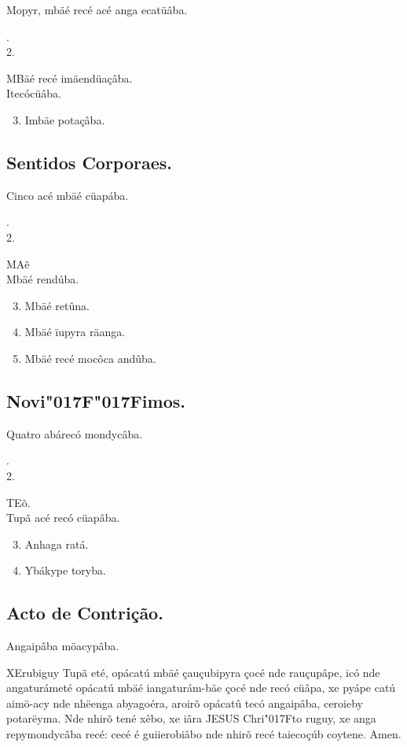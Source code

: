 \documentclass[openany,titlepage,12pt]{book}
\newcommand{\lgS}{\char"017F}
\newcommand{\lgSS}{\char"017F\char"017F}
\newcommand{\comecalista}[5]{
    \hspace*{-11.7pt}
    \begin{minipage}[t]{0.08\linewidth}
        \flushright #1\\#2
    \end{minipage}
    \hspace{0pt}
    \begin{minipage}[t]{0.94\linewidth}
        \lettrine
        [findent =2pt, nindent=0pt,  lines=2]
        {#3}{#4}#5
    \end{minipage}
    \vspace*{-3pt}
}
\begin{document}
\begin{center}
    Mopyr, mbäé recé acé anga ecatüâba.
\end{center}
\comecalista{1.}{2.}{M}{B}
    {äé recé imäendüaçâba.\\Itecócüâba.}
\vspace{2pt}
\begin{enumerate}
    \setcounter{enumi}{2}
    \item Imbäe potaçâba.
\end{enumerate}

\subsection{Sentidos Corporaes.}
\begin{center}
    Cinco acé mbäé cüapába.
\end{center}
\comecalista{1.}{2.}{M}{A}
    {ẽ\\Mbäé rendúba.}
\vspace{2pt}
\begin{enumerate}
    \setcounter{enumi}{2}
    \item Mbäé retûna.
    \item Mbäé ïupyra räanga.
    \item Mbäé recé mocôca andûba.
\end{enumerate}

\subsection{Novi\lgSS imos.}
\begin{center}
    Quatro abárecó mondycâba.    
\end{center}
\comecalista{1.}{2.}{T}{E}{õ.\\Tupã acé recó cüapâba.}
\begin{enumerate}
    \setcounter{enumi}{2}    
    \item Anhaga ratá.
    \item Ybákype toryba.
\end{enumerate}
\unskip
\vspace{6pt}%
\subsection{Acto de Contrição.}
\unskip\vspace*{-0.7\baselineskip}
\begin{center}
    Angaipâba möacypâba.
\end{center}
\unskip
\vspace{\baselineskip}
\lettrine[findent =2pt, nindent=0pt, lines=2]
{X}{E}rubiguy Tupã eté, opácatú mbäé çauçubipyra çocé nde
rauçupâpe, icó nde angaturámeté opácatú mbäé iangaturám-bäe
çocé nde recó cüâpa, xe pyápe catú aimö-acy nde nhëenga
abyagoéra, aroirõ opácatû tecó angaipâba, ceroieby potarëyma.
Nde nhirõ tené xêbo, xe iâra JESUS Chri\lgS to ruguy, xe 
anga repymondycâba recé: cecé é guiierobiâbo nde nhirõ recé
taiecoçúb coytene. Amen.
\end{document}
